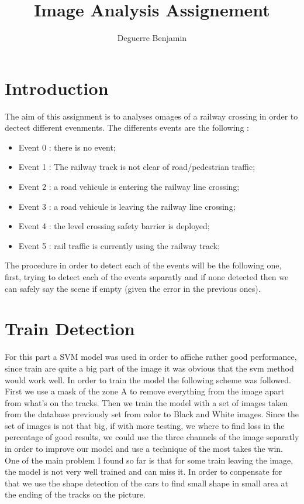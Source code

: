 \documentclass{report}
\title{Image Analysis Assignement}
\author{Deguerre Benjamin}
\begin{document}
\maketitle
\section{Introduction}
The aim of this assignment is to analyses omages of a railway crossing in order to dectect different evenments. The differents events are the following :
  \begin{itemize}
    \item Event 0 : there is no event;
    \item Event 1 : The railway track is not clear of road/pedestrian traffic;
    \item Event 2 : a road vehicule is entering the railway line crossing;
    \item Event 3 : a road vehicule is leaving the railway line crossing;
    \item Event 4 : the level crossing safety barrier is deployed;
    \item Event 5 : rail traffic is currently using the railway track;
  \end{itemize}

The procedure in order to detect each of the events will be the following one, first, trying to detect each of the events separatly and if none detected then we can safely say the scene if empty (given the error in the previous ones).

\section{Train Detection}
For this part a SVM model was used in order to affiche rather good performance, since train are quite a big part of the image it was obvious that the svm method would work well.
In order to train the model the following scheme was followed. First we use a mask of the zone A to remove everything from the image apart from what's on the tracks. Then we train the model with a set of images taken from the database previously set from color to Black and White images. Since the set of images is not that big, if with more testing, we where to find loss in the percentage of good results, we could use the three channels of the image separatly in order to improve our model and use a technique of the most takes the win.
One of the main problem I found so far is that for some train leaving the image, the model is not very well trained and can miss it. In order to conpensate for that we use the shape detection of the cars to find small shape in small area at the ending of the tracks on the picture.
\end{document}
